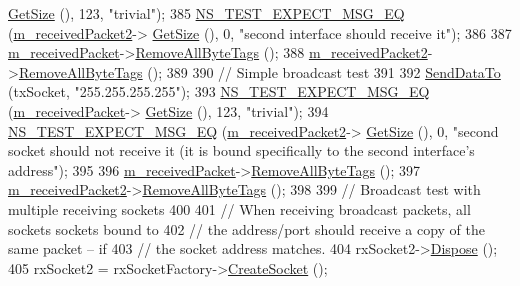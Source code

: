 \begin{DoxyCode}
      \hyperlink{classns3_1_1Packet_a462855c9929954d4301a4edfe55f4f1c}{GetSize} (), 123, \textcolor{stringliteral}{"trivial"});
385   \hyperlink{group__testing_ga7304ba46a28d8cf08dfdfd6499cf7068}{NS\_TEST\_EXPECT\_MSG\_EQ} (\hyperlink{classUdpSocketImplTest_adc156ecabbea0886db6024dbda1e8088}{m\_receivedPacket2}->
      \hyperlink{classns3_1_1Packet_a462855c9929954d4301a4edfe55f4f1c}{GetSize} (), 0, \textcolor{stringliteral}{"second interface should receive it"});
386 
387   \hyperlink{classUdpSocketImplTest_a991dccdef830885aab315ac9ee3c4a06}{m\_receivedPacket}->\hyperlink{classns3_1_1Packet_a083f54c9db31aeff30551a9e20fcda42}{RemoveAllByteTags} ();
388   \hyperlink{classUdpSocketImplTest_adc156ecabbea0886db6024dbda1e8088}{m\_receivedPacket2}->\hyperlink{classns3_1_1Packet_a083f54c9db31aeff30551a9e20fcda42}{RemoveAllByteTags} ();
389 
390   \textcolor{comment}{// Simple broadcast test}
391 
392   \hyperlink{classUdpSocketImplTest_a6d164a214837efedad2b6aa32a9fad0e}{SendDataTo} (txSocket, \textcolor{stringliteral}{"255.255.255.255"});
393   \hyperlink{group__testing_ga7304ba46a28d8cf08dfdfd6499cf7068}{NS\_TEST\_EXPECT\_MSG\_EQ} (\hyperlink{classUdpSocketImplTest_a991dccdef830885aab315ac9ee3c4a06}{m\_receivedPacket}->
      \hyperlink{classns3_1_1Packet_a462855c9929954d4301a4edfe55f4f1c}{GetSize} (), 123, \textcolor{stringliteral}{"trivial"});
394   \hyperlink{group__testing_ga7304ba46a28d8cf08dfdfd6499cf7068}{NS\_TEST\_EXPECT\_MSG\_EQ} (\hyperlink{classUdpSocketImplTest_adc156ecabbea0886db6024dbda1e8088}{m\_receivedPacket2}->
      \hyperlink{classns3_1_1Packet_a462855c9929954d4301a4edfe55f4f1c}{GetSize} (), 0, \textcolor{stringliteral}{"second socket should not receive it (it is bound specifically to the second
       interface's address"});
395 
396   \hyperlink{classUdpSocketImplTest_a991dccdef830885aab315ac9ee3c4a06}{m\_receivedPacket}->\hyperlink{classns3_1_1Packet_a083f54c9db31aeff30551a9e20fcda42}{RemoveAllByteTags} ();
397   \hyperlink{classUdpSocketImplTest_adc156ecabbea0886db6024dbda1e8088}{m\_receivedPacket2}->\hyperlink{classns3_1_1Packet_a083f54c9db31aeff30551a9e20fcda42}{RemoveAllByteTags} ();
398 
399   \textcolor{comment}{// Broadcast test with multiple receiving sockets}
400 
401   \textcolor{comment}{// When receiving broadcast packets, all sockets sockets bound to}
402   \textcolor{comment}{// the address/port should receive a copy of the same packet -- if}
403   \textcolor{comment}{// the socket address matches.}
404   rxSocket2->\hyperlink{classns3_1_1Object_aa90ae598863f6c251cdab3c3722afdaf}{Dispose} ();
405   rxSocket2 = rxSocketFactory->\hyperlink{classns3_1_1SocketFactory_a97351e6e7860503a4912042530449f62}{CreateSocket} ();

\end{DoxyCode}
